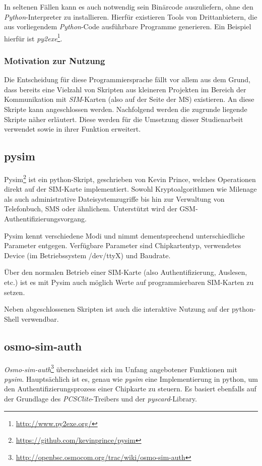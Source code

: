 In seltenen Fällen kann es auch notwendig sein Binärcode auszuliefern, ohne den
\textit{Python}-Interpreter zu installieren. Hierfür existieren Tools von Drittanbietern,
die aus vorliegendem \textit{Python}-Code ausführbare Programme generieren. Ein Beispiel hierfür
ist \textit{py2exe}\footnote{\url{http://www.py2exe.org/}}.

\subsubsection{Motivation zur Nutzung}
Die Entscheidung für diese Programmiersprache fällt vor allem aus dem Grund, dass bereits eine
Vielzahl von Skripten aus kleineren Projekten im Bereich der Kommunikation mit \textit{SIM}-Karten
(also auf der Seite der \ac{MS}) existieren. An diese Skripte kann angeschlossen werden. Nachfolgend werden die zugrunde liegende
Skripte näher erläutert. Diese werden für die Umsetzung dieser Studienarbeit verwendet sowie
in ihrer Funktion erweitert.

\subsection{pysim} %
\label{subsec:pysim}
Pysim\footnote{\url{https://github.com/kevinprince/pysim}} ist ein
python-Skript, geschrieben von Kevin Prince,
welches Operationen direkt auf der SIM-Karte implementiert.
Sowohl Kryptoalgorithmen wie Milenage als auch administrative Dateisystemzugriffe
bis hin zur Verwaltung von Telefonbuch, SMS oder ähnlichem.
Unterstützt wird der GSM-Authentifizierungsvorgang.

Pysim kennt verschiedene Modi und nimmt dementsprechend unterschiedliche
Parameter entgegen. Verfügbare Parameter sind Chipkartentyp, verwendetes
Device (im Betriebssystem /dev/ttyX) und Baudrate\cite{pysimprince}.

Über den normalen Betrieb einer SIM-Karte (also Authentifizierung, Auslesen, etc.)
ist es mit Pysim auch möglich Werte auf programmierbaren SIM-Karten zu setzen.

Neben abgeschlossenen Skripten ist auch die interaktive Nutzung auf der
python-Shell verwendbar.

\subsection{osmo-sim-auth}
\label{subsec:osmosim}
\textit{Osmo-sim-auth}\footnote{\url{http://openbsc.osmocom.org/trac/wiki/osmo-sim-auth}}
überschneidet sich im Unfang angebotener Funktionen mit \textit{pysim}. Hauptsächlich ist es,
genau wie \textit{pysim} eine Implementierung in python, um den Authentifizierungsprozess
einer Chipkarte zu steuern. Es basiert ebenfalls auf der Grundlage des
\textit{PCSClite}-Treibers und der \textit{pyscard}-Library.

